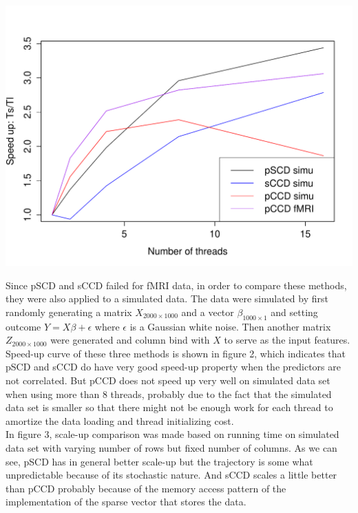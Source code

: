\documentclass[11 pt, a4paper]{article}  %
\begin{document}
\begin{center}
\includegraphics[scale=0.5]{speedup.pdf}
\end{center}

Since pSCD and sCCD failed for fMRI data, in order to compare these methods, they were also applied to a simulated data. The data were simulated by first randomly generating a matrix $X_{2000\times 1000}$ and a vector $\beta_{1000\times 1}$ and setting outcome $Y = X\beta + \epsilon$ where $\epsilon$ is a Gaussian white noise. Then another matrix $Z_{2000\times 1000}$ were generated and column bind with $X$ to serve as the input features. Speed-up curve of these three methods is shown in figure 2, which indicates that pSCD and sCCD do have very good speed-up property when the predictors are not correlated. But pCCD does not speed up very well on simulated data set when using more than $8$ threads, probably due to the fact that the simulated data set is smaller so that there might not be enough work for each thread to amortize the data loading and thread initializing cost.\\

In figure 3, scale-up comparison was made based on running time on simulated data set with varying number of rows but fixed number of columns. As we can see, pSCD has in general better scale-up but the trajectory is some what unpredictable because of its stochastic nature. And sCCD scales a little better than pCCD probably because of the memory access pattern of the implementation of the sparse vector that stores the data.\\
\end{document}
